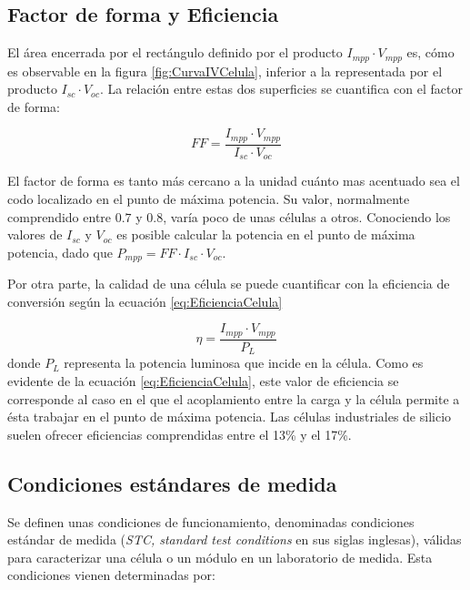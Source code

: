 \subsection{Factor de forma y Eficiencia}

El área encerrada por el rectángulo definido por el producto $I_{mpp}\cdot V_{mpp}$
es, cómo es observable en la figura \ref{fig:CurvaIVCelula}, inferior
a la representada por el producto $I_{sc}\cdot V_{oc}$. La relación
entre estas dos superficies se cuantifica con el factor de forma:

\begin{equation}
FF=\frac{I_{mpp}\cdot V_{mpp}}{I_{sc}\cdot V_{oc}}\label{eq:FactorForma}\end{equation}

El factor de forma es tanto más cercano a la unidad cuánto mas acentuado
sea el codo localizado en el punto de máxima potencia. Su valor, normalmente
comprendido entre $0.7$ y $0.8$, varía poco de unas células a otros.
Conociendo los valores de $I_{sc}$ y $V_{oc}$ es posible calcular
la potencia en el punto de máxima potencia, dado que $P_{mpp}=FF\cdot I_{sc}\cdot V_{oc}$.

Por otra parte, la calidad de una célula se puede cuantificar con
la eficiencia de conversión según la ecuación \ref{eq:EficienciaCelula}

\begin{equation}
\eta=\frac{I_{mpp}\cdot V_{mpp}}{P_{L}}\label{eq:EficienciaCelula}\end{equation}
donde $P_{L}$
representa la potencia luminosa que incide en la célula. Como es evidente
de la ecuación \ref{eq:EficienciaCelula}, este valor de eficiencia
se corresponde al caso en el que el acoplamiento entre la carga y
la célula permite a ésta trabajar en el punto de máxima potencia.
Las células industriales de silicio suelen ofrecer eficiencias comprendidas
entre el 13\% y el 17\%.


\subsection{Condiciones estándares de medida}
\label{sec:STC}

Se definen unas condiciones de funcionamiento, denominadas condiciones
estándar de medida (\emph{STC, standard test conditions} en sus siglas
inglesas), válidas para caracterizar una célula o un módulo en un
laboratorio de medida. Esta condiciones vienen determinadas por:

